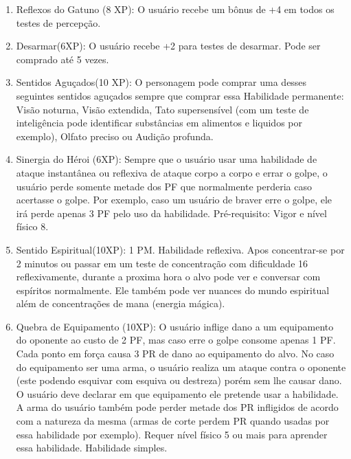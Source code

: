 \begin{enumerate}
	\item Reflexos do Gatuno (8 XP): O usuário recebe um bônus de +4 em todos os testes de percepção.

 	\item Desarmar(6XP): O usuário recebe +2 para testes de desarmar. Pode ser comprado até 5 vezes.

	\item Sentidos Aguçados(10 XP): O personagem pode comprar uma desses seguintes sentidos aguçados sempre que comprar essa Habilidade permanente: Visão noturna, Visão extendida, Tato supersensível (com um teste de inteligência pode identificar substâncias em alimentos e liquidos por exemplo), Olfato preciso ou Audição profunda.

	\item Sinergia do Héroi (6XP): Sempre que o usuário usar uma habilidade de ataque instantânea ou reflexiva de ataque corpo a corpo e errar o golpe, o usuário perde somente metade dos PF que normalmente perderia caso acertasse o golpe. Por exemplo, caso um usuário de braver erre o golpe, ele irá perde apenas 3 PF pelo uso da habilidade. Pré-requisito: Vigor e nível físico 8.

	\item Sentido Espiritual(10XP): 1 PM. Habilidade reflexiva.\newline
Apos concentrar-se por 2 minutos ou passar em um teste de concentração com dificuldade 16 reflexivamente, durante a proxima hora o alvo pode ver e conversar com espíritos normalmente. Ele também pode ver nuances do mundo espiritual além de concentrações de mana (energia mágica). 

	\item Quebra de Equipamento (10XP): O usuário inflige dano a um equipamento do oponente ao custo de 2 PF, mas caso erre o golpe consome apenas 1 PF. Cada ponto em força causa 3 PR de dano ao equipamento do alvo. No caso do equipamento ser uma arma, o usuário realiza um ataque contra o oponente (este podendo esquivar com esquiva ou destreza) porém sem lhe causar dano.  O usuário deve declarar em que equipamento ele pretende usar a habilidade.  A arma do usuário também pode perder metade dos PR infligidos de acordo com a natureza da mesma (armas de corte perdem PR quando usadas por essa habilidade por exemplo). Requer nível físico 5 ou mais para aprender essa habilidade. Habilidade simples.


\end{enumerate}
